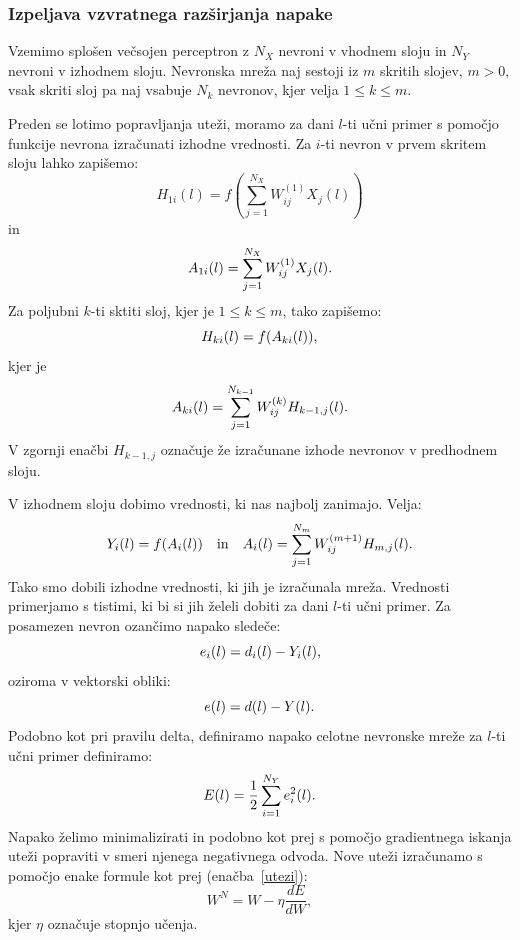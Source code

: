 \documentclass[mat1]{fmfdelo}
\begin{document}
\subsubsection{Izpeljava vzvratnega razširjanja napake}
Vzemimo splošen večsojen perceptron z $N_X$ nevroni v vhodnem sloju in $N_Y$ nevroni v izhodnem sloju. Nevronska mreža naj sestoji iz $m$ skritih slojev, $m>0$, vsak skriti sloj pa naj vsabuje $N_k$ nevronov, kjer velja $1\leq k \leq m$. 

Preden se lotimo popravljanja uteži, moramo za dani $l$-ti učni primer s pomočjo funkcije nevrona izračunati izhodne vrednosti. Za $i$-ti nevron v prvem skritem sloju lahko zapišemo:
%
\begin{equation*}
H_{1i}(l) = f\left( \sum^{N_X}_{j=1}{W^{(1)}_{ij}X_j(l)}\right)
\end{equation*}
%
in
%
\begin{equation*}
A_{1i}(l) =\sum^{N_X}_{j=1}{W^{(1)}_{ij}X_j(l)}\text.
\end{equation*}
%
Za poljubni $k$-ti sktiti sloj, kjer je $1\leq k \leq m$, tako zapišemo:
%
\begin{equation*}
H_{ki}(l) = f(A_{ki}(l))\text,
\end{equation*}
%
kjer je
%
\begin{equation*}
A_{ki}(l) = \sum^{N_{k-1}}_{j=1}W^{(k)}_{ij}H_{k-1,j}(l)\text.
\end{equation*}
%
V zgornji enačbi $H_{k-1,j}$ označuje že izračunane izhode nevronov v predhodnem sloju.
 
 V izhodnem sloju dobimo vrednosti, ki nas najbolj zanimajo. Velja:
%
\begin{equation*}
Y_{i}(l) = f(A_{i}(l)) \quad \text{in} \quad A_{i}(l) = \sum^{N_{m}}_{j=1}{W^{(m+1)}_{ij}H_{m,j}(l)}\text.
\end{equation*}
%
Tako smo dobili izhodne vrednosti, ki jih je izračunala mreža. Vrednosti primerjamo s tistimi, ki bi si jih želeli dobiti za dani $l$-ti učni primer. Za posamezen nevron ozančimo napako sledeče:
%
\begin{equation}
e_i(l) = d_i(l) - Y_i(l)\text,
\end{equation}
oziroma v vektorski obliki:
\begin{equation*}
e(l) = d(l) - Y(l)\text.
\end{equation*}
Podobno kot pri pravilu delta, definiramo napako celotne nevronske mreže za $l$-ti učni primer definiramo:
%
\begin{equation}
E(l) = \frac{1}{2}\sum^{N_Y}_{i=1}e_i^2(l)\text.
\label{napaka}
\end{equation}
%
Napako želimo minimalizirati in podobno kot prej s pomočjo gradientnega iskanja uteži popraviti v smeri njenega negativnega odvoda. Nove uteži izračunamo s pomočjo enake formule kot prej (enačba~\eqref{utezi}):
\begin{equation*}
W^{N} = W - \eta \frac{dE}{dW}, 
\end{equation*}
%
kjer $\eta$ označuje stopnjo učenja. 
\end{document}
